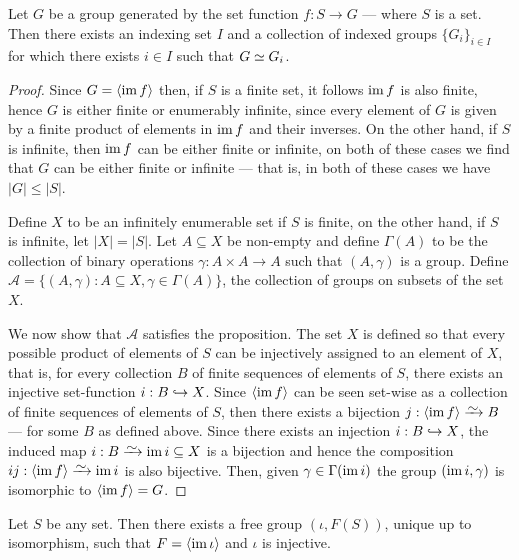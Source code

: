\begin{lemma}\label{lem:isomorphism-indexing-set-group}
Let \(G\) be a group generated by the set function \(f: S \to G\) --- where \(S\) is
a set. Then there exists an indexing set \(I\) and a collection of indexed
groups \(\{G_i\}_{i \in I}\) for which there exists \(i \in I\) such that \(G \simeq
G_i\).
\end{lemma}

\begin{proof}
Since \(G = \left\langle \operatorname{im} f \right\rangle\) then, if \(S\) is a finite set, it follows
\(\operatorname{im} f\) is also finite, hence \(G\) is either finite or enumerably infinite,
since every element of \(G\) is given by a finite product of elements in \(\operatorname{im}
f\) and their inverses. On the other hand, if \(S\) is infinite, then \(\operatorname{im} f\)
can be either finite or infinite, on both of these cases we find that \(G\) can
be either finite or infinite --- that is, in both of these cases we have \(|G| \leq
|S|\).

Define \(X\) to be an infinitely enumerable set if \(S\) is finite, on the other
hand, if \(S\) is infinite, let \(|X| = |S|\). Let \(A \subseteq X\) be non-empty and
define \(\Gamma(A)\) to be the collection of binary operations \(\gamma: A \times A \to A\) such
that \((A, \gamma)\) is a group. Define \(\mathcal{A} = \{(A, \gamma): A \subseteq X, \gamma \in \Gamma(A)\}\), the
collection of groups on subsets of the set \(X\).

We now show that \(\mathcal{A}\) satisfies the proposition. The set \(X\) is defined so
that every possible product of elements of \(S\) can be injectively assigned to
an element of \(X\), that is, for every collection \(B\) of finite sequences of
elements of \(S\), there exists an injective set-function \(i: B \hookrightarrow
X\). Since \(\left\langle \operatorname{im} f \right\rangle\) can be seen set-wise as a collection of
finite sequences of elements of \(S\), then there exists a bijection \(j: \left\langle
\im f \right\rangle \isoto B\) --- for some \(B\) as defined above. Since there exists
an injection \(i: B \hookrightarrow X\), the induced map \(i: B \isoto \im i \subseteq X\) is
a bijection and hence the composition \(ij: \left\langle \im f \right\rangle \isoto \im i\)
is also bijective. Then, given \(\gamma \in \Gamma(\operatorname{im} i)\) the group \((\operatorname{im} i, \gamma)\) is
isomorphic to \(\left\langle \operatorname{im} f \right\rangle = G\).
\end{proof}

\begin{proposition}
\label{prop:universal-free-group}
Let \(S\) be any set. Then there exists a free group \((\iota, F(S))\), unique up
to isomorphism, such that \(F = \left\langle \operatorname{im} \iota \right\rangle\) and \(\iota\) is injective.
\end{proposition}

